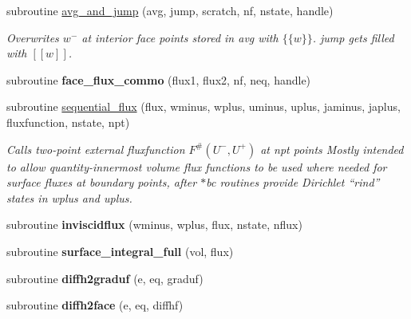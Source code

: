\begin{DoxyCompactItemize}
subroutine \hyperlink{group__isurf_gaf55d5b18c1b922832898c46176f13386}{avg\-\_\-and\-\_\-jump} (avg, jump, scratch, nf, nstate, handle)
\begin{DoxyCompactList}\small\item\em Overwrites $w^-$ at interior face points stored in avg with $\{\{w\}\}$. jump gets filled with $[[w]]$. \end{DoxyCompactList}\item 
\hypertarget{surface__fluxes_8f_aeaa6969f01eddd2eae8367f610d54d8b}{subroutine {\bfseries face\-\_\-flux\-\_\-commo} (flux1, flux2, nf, neq, handle)}\label{surface__fluxes_8f_aeaa6969f01eddd2eae8367f610d54d8b}

\end{DoxyCompactItemize}
{\bf }\par
\begin{DoxyCompactItemize}
\item 
subroutine \hyperlink{group__flux_ga4498a8903b8de21f2c0afd0d34c5e00c}{sequential\-\_\-flux} (flux, wminus, wplus, uminus, uplus, jaminus, japlus, fluxfunction, nstate, npt)
\begin{DoxyCompactList}\small\item\em Calls two-\/point external fluxfunction $F^{\#}(U^-,U^+)$ at npt points Mostly intended to allow quantity-\/innermost volume flux functions to be used where needed for surface fluxes at boundary points, after $\ast$bc routines provide Dirichlet ``rind'' states in wplus and uplus. \end{DoxyCompactList}\item 
\hypertarget{group__flux_ga07b6f239f6de61d489a639234c55dac3}{subroutine {\bfseries inviscidflux} (wminus, wplus, flux, nstate, nflux)}\label{group__flux_ga07b6f239f6de61d489a639234c55dac3}

\item 
\hypertarget{group__flux_ga799332814e9d69e56ae5cc53dd448ebc}{subroutine {\bfseries surface\-\_\-integral\-\_\-full} (vol, flux)}\label{group__flux_ga799332814e9d69e56ae5cc53dd448ebc}

\item 
\hypertarget{group__flux_ga88fa0428bc395bf4e785ac7c484fc587}{subroutine {\bfseries diffh2graduf} (e, eq, graduf)}\label{group__flux_ga88fa0428bc395bf4e785ac7c484fc587}

\item 
\hypertarget{group__flux_ga41a0b6638f2086e785a2eee46c838140}{subroutine {\bfseries diffh2face} (e, eq, diffhf)}\label{group__flux_ga41a0b6638f2086e785a2eee46c838140}


\end{DoxyCompactItemize}
